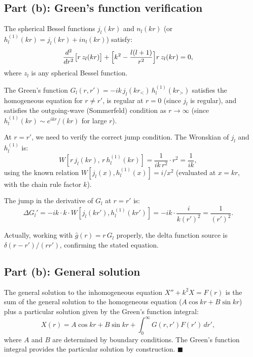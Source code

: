 \documentclass[12pt]{article}
\begin{document}
\subsection*{Part (b): Green's function verification}

The spherical Bessel functions $j_l(kr)$ and $n_l(kr)$ (or $h_l^{(1)}(kr) = j_l(kr) + in_l(kr)$) satisfy:
\[
\frac{d^2}{dr^2}\bigl[r\,z_l(kr)\bigr] + \Bigl[k^2 - \frac{l(l+1)}{r^2}\Bigr]r\,z_l(kr) = 0,
\]
where $z_l$ is any spherical Bessel function.

The Green's function $G_l(r,r') = -ik\,j_l(kr_<)\,h_l^{(1)}(kr_>)$ satisfies the homogeneous equation for $r \neq r'$, is regular at $r = 0$ (since $j_l$ is regular), and satisfies the outgoing-wave (Sommerfeld) condition as $r \to \infty$ (since $h_l^{(1)}(kr) \sim e^{ikr}/(kr)$ for large $r$).

At $r = r'$, we need to verify the correct jump condition. The Wronskian of $j_l$ and $h_l^{(1)}$ is:
\[
W[r\,j_l(kr),\, r\,h_l^{(1)}(kr)] = \frac{1}{ik\,r^2}\cdot r^2 = \frac{1}{ik},
\]
using the known relation $W[j_l(x), h_l^{(1)}(x)] = i/x^2$ (evaluated at $x = kr$, with the chain rule factor $k$).

The jump in the derivative of $G_l$ at $r = r'$ is:
\[
\Delta G_l' = -ik \cdot k \cdot W[j_l(kr'), h_l^{(1)}(kr')] = -ik \cdot \frac{i}{k(r')^2} = \frac{1}{(r')^2}.
\]

Actually, working with $\hat{g}(r) = r\,G_l$ properly, the delta function source is $\delta(r-r')/(rr')$, confirming the stated equation.

\subsection*{Part (b): General solution}

The general solution to the inhomogeneous equation $X'' + k^2 X = F(r)$ is the sum of the general solution to the homogeneous equation ($A\cos kr + B\sin kr$) plus a particular solution given by the Green's function integral:
\[
X(r) = A\cos kr + B\sin kr + \int_0^\infty G(r,r')F(r')\,dr',
\]
where $A$ and $B$ are determined by boundary conditions. The Green's function integral provides the particular solution by construction. $\blacksquare$
\end{document}
